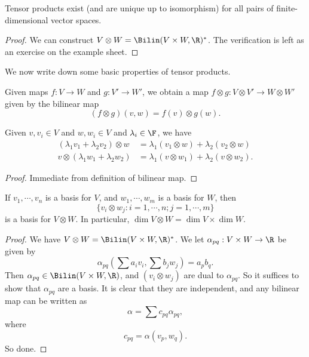 \documentclass[a4paper]{article}
\begin{document}
\begin{lemma}
  Tensor products exist (and are unique up to isomorphism) for all pairs of finite-dimensional vector spaces.
\end{lemma}

\begin{proof}
  We can construct $V \otimes W = \Bilin(V \times W, \R)^*$. The verification is left as an exercise on the example sheet.
\end{proof}

We now write down some basic properties of tensor products.
\begin{prop}
  Given maps $f: V \to W$ and $g: V' \to W'$, we obtain a map $f \otimes g: V \otimes V' \to W \otimes W'$ given by the bilinear map
  \[
    (f \otimes g)(v, w) = f(v) \otimes g(w).
  \]
\end{prop}

\begin{lemma}
  Given $v, v_i \in V$ and $w, w_i \in V$ and $\lambda_i \in \F$, we have
  \begin{align*}
    (\lambda_1 v_1 + \lambda_2 v_2) \otimes w &= \lambda_1 (v_1 \otimes w) + \lambda_2 (v_2 \otimes w)\\
    v \otimes (\lambda_1 w_1 + \lambda_2 w_2) &= \lambda_1 (v \otimes w_1) + \lambda_2 (v \otimes w_2).
  \end{align*}
\end{lemma}

\begin{proof}
  Immediate from definition of bilinear map.
\end{proof}

\begin{lemma}
  If $v_1,\cdots, v_n$ is a basis for $V$, and $w_1, \cdots, w_m$ is a basis for $W$, then
  \[
    \{v_i \otimes w_j: i = 1, \cdots, n; j = 1, \cdots, m\}
  \]
  is a basis for $V \otimes W$. In particular, $\dim V \otimes W = \dim V \times \dim W$.
\end{lemma}

\begin{proof}
  We have $V \otimes W = \Bilin(V \times W, \R)^*$. We let $\alpha_{pq}:V \times W \to \R$ be given by
  \[
    \alpha_{pq}\left(\sum a_i v_i, \sum b_j w_j\right) = a_p b_q.
  \]
  Then $\alpha_{pq} \in \Bilin(V\times W, \R)$, and $(v_i \otimes w_j)$ are dual to $\alpha_{pq}$. So it suffices to show that $\alpha_{pq}$ are a basis. It is clear that they are independent, and any bilinear map can be written as
  \[
    \alpha = \sum c_{pq}\alpha_{pq},
  \]
  where
  \[
    c_{pq} = \alpha(v_p, w_q).
  \]
  So done.
\end{proof}
\end{document}
